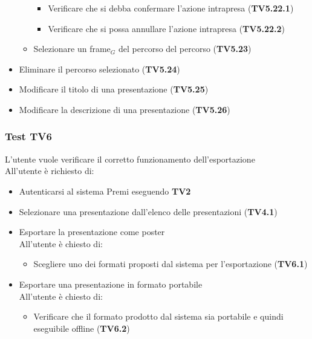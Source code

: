 \begin{itemize}
\begin{itemize}
    	     \begin{itemize}
    	     	\item Verificare che si debba confermare l'azione intrapresa (\textbf{TV5.22.1})
    	     	\item Verificare che si possa annullare l'azione intrapresa (\textbf{TV5.22.2})
    	     \end{itemize}
    	\item Selezionare un frame$_G$ del percorso del percorso (\textbf{TV5.23})
    \end{itemize}
    \item Eliminare il percorso selezionato (\textbf{TV5.24})
    \item Modificare il titolo di una presentazione (\textbf{TV5.25})
    \item Modificare la descrizione di una presentazione (\textbf{TV5.26})
\end{itemize}


\subsubsection {Test TV6} %

L'utente vuole verificare il corretto funzionamento dell'esportazione\\
All'utente è richiesto di:

\begin{itemize}
	\item Autenticarsi al sistema Premi eseguendo \textbf{TV2}
	\item Selezionare una presentazione dall'elenco delle presentazioni  (\textbf{TV4.1})
	\item Esportare la presentazione come poster\\
	All'utente è chiesto di:
 \begin{itemize}
 	\item Scegliere uno  dei formati proposti dal sistema per l'esportazione (\textbf{TV6.1})
 	\end{itemize}
	\item Esportare una presentazione in formato portabile\\
	All'utente è chiesto di:
	 \begin{itemize}
	 	\item Verificare che il formato prodotto dal sistema sia portabile e quindi eseguibile offline (\textbf{TV6.2})
	 \end{itemize}
\end{itemize}


